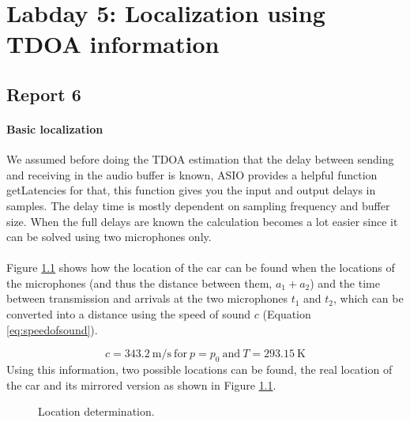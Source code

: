 \documentclass[final]{scrreprt} %
\begin{document}
\chapter{Labday 5: Localization using TDOA information}
\label{ch:labday5}
\section{Report 6}
\subsubsection{Basic localization}
We assumed before doing the TDOA estimation that the delay between sending and receiving in the audio buffer is known, ASIO provides a helpful function getLatencies for that, this function gives you the input and output delays in samples.
The delay time is mostly dependent on sampling frequency and buffer size.
When the full delays are known the calculation becomes a lot easier since it can be solved using two microphones only.
\\ \\
Figure \ref{fig:location} shows how the location of the car can be found when the locations of the microphones (and thus the distance between them, $a_1 + a_2$) and the time between transmission and arrivals at the two microphones $t_1$ and $t_2$, which can be converted into a distance using the speed of sound $c$ (Equation \ref{eq:speedofsound}).

\begin{equation}
c=\SI{343.2}{\meter\per\second}~\mathrm{for}~p = p_0~\mathrm{and}~T = \SI{293.15}{\kelvin}
\label{eq:speedofsound}
\end{equation}
Using this information, two possible locations can be found, the real location of the car and its mirrored version as shown in Figure \ref{fig:location}.

\begin{figure} [H]
\centering
	\caption{Location determination.}
	\label{fig:location}
\end{figure}
\end{document}
